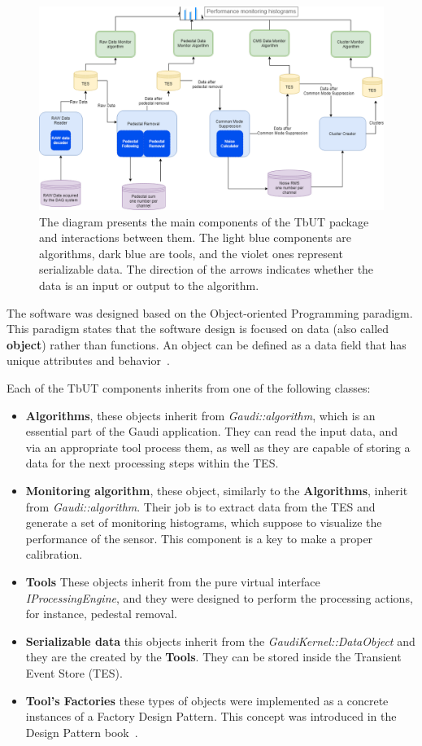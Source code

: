 \begin{figure}[h]
\centering
\includegraphics{figures/TBUT.png}
\caption{The diagram presents the main components of the TbUT package and interactions between them. The light blue components are algorithms, dark blue are tools, and the violet ones represent serializable data. The direction of the arrows indicates whether the data is an input or output to the algorithm. }
\label{fig:TbUT}
\end{figure}

The software was designed based on the Object-oriented Programming paradigm. This paradigm states that the software design is focused on data (also called \textbf{object}) rather than functions. An object can be defined as a data field that has unique attributes and behavior~\cite{programming_paradigma}. 

Each of the TbUT components inherits from one of the following classes:  

\begin{itemize}
    \item \textbf{Algorithms}, these objects inherit from \textit{Gaudi::algorithm}, which is an essential part of the Gaudi application. They can read the input data, and via an appropriate tool process them, as well as they are capable of storing a data for the next processing steps within the TES. 
    \item \textbf{Monitoring algorithm}, these object, similarly to the \textbf{Algorithms}, inherit from  \textit{Gaudi::algorithm}. Their job is to extract data from the TES and generate a set of monitoring histograms, which suppose to visualize the performance of the sensor. This component is a key to make a proper calibration. 
    \item \textbf{Tools} These objects inherit from the pure virtual interface \textit{IProcessingEngine}, and they were designed to perform the processing actions, for instance, pedestal removal. 
    \item \textbf{Serializable data} this objects inherit from the \textit{GaudiKernel::DataObject} and they are the created by the \textbf{Tools}. They can be stored inside the Transient Event Store (TES). 
    \item \textbf{ Tool's Factories} these types of objects were implemented as a concrete instances of a Factory Design Pattern. This concept was introduced in the Design Pattern book~\cite{DesignPatterns}. 
\end{itemize}

